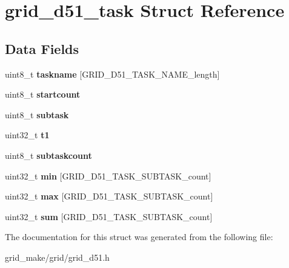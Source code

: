 \hypertarget{structgrid__d51__task}{\section{grid\-\_\-d51\-\_\-task Struct Reference}
\label{structgrid__d51__task}
}
\subsection*{Data Fields}
\begin{DoxyCompactItemize}
\item 
\hypertarget{structgrid__d51__task_a5db3ef7421b49e7856af7b0e7e39c0ad}{uint8\-\_\-t {\bfseries taskname} \mbox{[}G\-R\-I\-D\-\_\-\-D51\-\_\-\-T\-A\-S\-K\-\_\-\-N\-A\-M\-E\-\_\-length\mbox{]}}\label{structgrid__d51__task_a5db3ef7421b49e7856af7b0e7e39c0ad}

\item 
\hypertarget{structgrid__d51__task_af0325027a060719acd4220e8b0115324}{uint8\-\_\-t {\bfseries startcount}}\label{structgrid__d51__task_af0325027a060719acd4220e8b0115324}

\item 
\hypertarget{structgrid__d51__task_afd052c0b456dea2a209875aa32f0af27}{uint8\-\_\-t {\bfseries subtask}}\label{structgrid__d51__task_afd052c0b456dea2a209875aa32f0af27}

\item 
\hypertarget{structgrid__d51__task_ac98e576b660bd5a3aa96827e22d60318}{uint32\-\_\-t {\bfseries t1}}\label{structgrid__d51__task_ac98e576b660bd5a3aa96827e22d60318}

\item 
\hypertarget{structgrid__d51__task_aa47b89669a404e9873677b21856ddf7f}{uint8\-\_\-t {\bfseries subtaskcount}}\label{structgrid__d51__task_aa47b89669a404e9873677b21856ddf7f}

\item 
\hypertarget{structgrid__d51__task_a754c2ce9e1617ea20652b795ebfe9f34}{uint32\-\_\-t {\bfseries min} \mbox{[}G\-R\-I\-D\-\_\-\-D51\-\_\-\-T\-A\-S\-K\-\_\-\-S\-U\-B\-T\-A\-S\-K\-\_\-count\mbox{]}}\label{structgrid__d51__task_a754c2ce9e1617ea20652b795ebfe9f34}

\item 
\hypertarget{structgrid__d51__task_a1ab1bf93b24ce9be1b881a901e3638b9}{uint32\-\_\-t {\bfseries max} \mbox{[}G\-R\-I\-D\-\_\-\-D51\-\_\-\-T\-A\-S\-K\-\_\-\-S\-U\-B\-T\-A\-S\-K\-\_\-count\mbox{]}}\label{structgrid__d51__task_a1ab1bf93b24ce9be1b881a901e3638b9}

\item 
\hypertarget{structgrid__d51__task_a4f75d4cef3c3f66d2ed1f22fbe4b916a}{uint32\-\_\-t {\bfseries sum} \mbox{[}G\-R\-I\-D\-\_\-\-D51\-\_\-\-T\-A\-S\-K\-\_\-\-S\-U\-B\-T\-A\-S\-K\-\_\-count\mbox{]}}\label{structgrid__d51__task_a4f75d4cef3c3f66d2ed1f22fbe4b916a}

\end{DoxyCompactItemize}


The documentation for this struct was generated from the following file\-:\begin{DoxyCompactItemize}
\item 
grid\-\_\-make/grid/grid\-\_\-d51.\-h\end{DoxyCompactItemize}
